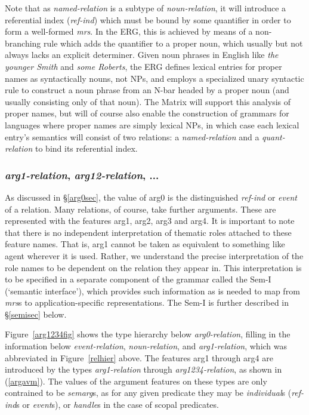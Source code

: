 \documentclass[12pt]{article}
\begin{document}
Note that as {\it named-relation} is a subtype of {\it noun-relation}, it
will introduce a referential index ({\it ref-ind}) which must
be bound by some quantifier in order to form a well-formed {\it mrs}.
In the ERG, this is achieved by means of a non-branching rule
which adds the quantifier to a proper noun, which usually but not always
lacks an explicit determiner.  Given noun phrases in English like {\it the
younger Smith} and {\it some Roberts}, the ERG defines lexical entries
for proper names as syntactically nouns, not NPs, and employs a specialized
unary syntactic rule to construct a noun phrase from an N-bar headed by
a proper noun (and usually consisting only of that noun).  The Matrix will
support this analysis of proper names, but will of course also enable the
construction of grammars for languages where proper names are simply lexical 
NPs, in which case each lexical entry's semantics will consist of two
relations: a {\it named-relation} and a {\it quant-relation} to bind its 
referential
index.

\subsubsection{{\it arg1-relation}, {\it arg12-relation}, ...}

As discussed in \S\ref{arg0sec}, the value of {\sc arg0} is the
distinguished {\it ref-ind} or {\it event} of a relation.  Many
relations, of course, take further arguments.  These are represented
with the features {\sc arg1}, {\sc arg2}, {\sc arg3} and {\sc arg4}.
It is important to note that there is no independent interpretation
of thematic roles attached to these feature names.  That is, {\sc arg1} 
cannot be taken as equivalent to something like {\sc agent} wherever 
it is used.
Rather, we understand the precise interpretation of the role names to
be dependent on the relation they appear in.  This interpretation is
to be specified in a separate component of the grammar called the
Sem-I (`semantic interface'), which provides such information as is
needed to map from {\it mrs}s to application-specific representations.
The Sem-I is further described in \S\ref{semisec} below.

Figure~\ref{arg1234fig} shows the type hierarchy below {\it arg0-relation},
filling in the information below {\it event-relation}, {\it noun-relation}, 
and {\it arg1-relation},
which was abbreviated in Figure~\ref{relhier} above.  The features
{\sc arg1} through {\sc arg4} are introduced by the types {\it
arg1-relation} through {\it arg1234-relation}, as shown in (\ref{argavm}).
The values of the argument features on these types are only
contrained to be {\it semarg}s, as for any given predicate
they may be {\it individual}s ({\it ref-ind}s or {\it event}s), or
{\it handle}s in the case of scopal predicates.
\end{document}

